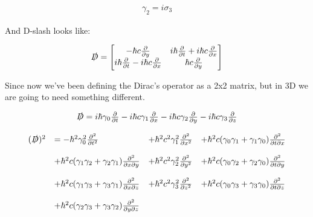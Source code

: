 \begin{equation}
\begin{array}{c}
  \gamma_2 =i\sigma_3
\end{array}
\end{equation}

And D-slash looks like:

\begin{equation}
  \begin{array}{c}
    \slashed{D} = \begin{bmatrix}
      -\hbar c \frac{\partial}{\partial y} &  i\hbar \frac{\partial}{\partial t}+i\hbar c\frac{\partial}{\partial x} \\
      i\hbar \frac{\partial}{\partial t}-i\hbar c\frac{\partial}{\partial x} & \hbar c \frac{\partial}{\partial y}\end{bmatrix}
  \end{array}
\end{equation}

Since now we've been defining the Dirac's operator as a 2x2 matrix, but in 3D we are going to need something different.

\begin{equation}
  \begin{array}{c}
    \slashed{D} = i\hbar\gamma_0 \frac{\partial}{\partial t} - i\hbar c \gamma_1 \frac{\partial}{\partial x} - i\hbar c\gamma_2 \frac{\partial}{\partial y} - i\hbar c\gamma_3 \frac{\partial}{\partial z}
    \\

    \\
    \begin{array}{llll}
      (\slashed{D})^2 &= -\hbar^2 \gamma_0^2 \frac{\partial^2}{\partial t^2} &+ \hbar^2 c^2 \gamma_1^2 \frac{\partial^2}{\partial x^2} &+ \hbar^2 c (\gamma_0\gamma_1 + \gamma_1\gamma_0)\frac{\partial^2}{\partial t \partial x}
    \\

    \\
                    &+ \hbar^2 c (\gamma_1\gamma_2 + \gamma_2\gamma_1)\frac{\partial^2}{\partial x \partial y}  &+\hbar^2 c^2 \gamma_2^2 \frac{\partial^2}{\partial y^2}  &+ \hbar^2 c (\gamma_0\gamma_2 + \gamma_2\gamma_0)\frac{\partial^2}{\partial t \partial y}
    \\

    \\
                    &+\hbar^2 c (\gamma_1\gamma_3 + \gamma_3\gamma_1)\frac{\partial^2}{\partial x \partial z}  &+\hbar^2 c^2 \gamma_3^2 \frac{\partial^2}{\partial z^2} &+ \hbar^2 c (\gamma_0\gamma_3 + \gamma_3\gamma_0)\frac{\partial^2}{\partial t \partial z}
    \\

    \\
                    &+\hbar^2 c (\gamma_2\gamma_3 + \gamma_3\gamma_2)\frac{\partial^2}{\partial y \partial z}
    \end{array}
  \end{array}
\end{equation}

